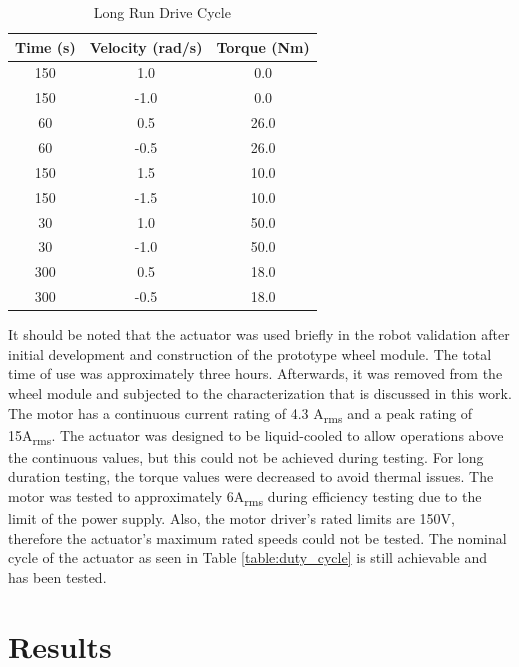 \begin{table}[t]
  \vskip0.2cm
  \caption{Long Run Drive Cycle}
  \label{table:long_run}
  \begin{center}
    \vskip-0.2cm
    \begin{tabular}{|c||c||c|}
    \hline
    Time (s) & Velocity (rad/s) & Torque (Nm)\\
    \hline
    150 & 1.0 & 0.0\\
    \hline
    150 & -1.0 & 0.0\\
    \hline
    60 & 0.5 & 26.0\\
    \hline
    60 & -0.5 & 26.0\\
    \hline
    150 & 1.5 & 10.0\\
    \hline
    150 & -1.5 & 10.0\\
    \hline
    30 & 1.0 & 50.0\\
    \hline
    30 & -1.0 & 50.0\\
    \hline
    300 & 0.5 & 18.0\\
    \hline
    300 & -0.5 & 18.0\\
    \hline
    \end{tabular}
  \end{center}
\end{table}

It should be noted that the actuator was used briefly in the robot validation after initial development and construction of the prototype wheel module.
The total time of use was approximately three hours.
Afterwards, it was removed from the wheel module and subjected to the characterization that is discussed in this work.
The motor has a continuous current rating of 4.3 A\textsubscript{rms} and a peak rating of 15A\textsubscript{rms}.
The actuator was designed to be liquid-cooled to allow operations above the continuous values, but this could not be achieved during testing.
For long duration testing, the torque values were decreased to avoid thermal issues.
The motor was tested to approximately 6A\textsubscript{rms} during efficiency testing due to the limit of the power supply.
Also, the motor driver's rated limits are 150V, therefore the actuator's maximum rated speeds could not be tested.
The nominal cycle of the actuator as seen in Table \ref{table:duty_cycle} is still achievable and has been tested.



\section{Results} \label{ch:single:eff_results}

